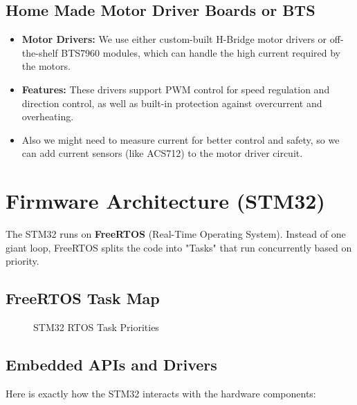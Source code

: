 \documentclass[12pt, a4paper]{article}
\begin{document}
\subsection{Home Made Motor Driver Boards or BTS }
\begin{itemize}
    \item \textbf{Motor Drivers:} We use either custom-built H-Bridge motor drivers or off-the-shelf BTS7960 modules, which can handle the high current required by the motors.
    \item \textbf{Features:} These drivers support PWM control for speed regulation and direction control, as well as built-in protection against overcurrent and overheating.
    \item Also we might need to measure current for better control and safety, so we can add current sensors (like ACS712) to the motor driver circuit.
\end{itemize}

\newpage

\section{Firmware Architecture (STM32)}
The STM32 runs on \textbf{FreeRTOS} (Real-Time Operating System). Instead of one giant loop, FreeRTOS splits the code into "Tasks" that run concurrently based on priority.

\subsection{FreeRTOS Task Map}
\begin{figure}[H]
\centering
{}
\caption{STM32 RTOS Task Priorities}
\end{figure}

\subsection{Embedded APIs and Drivers}
Here is exactly how the STM32 interacts with the hardware components:
\end{document}
